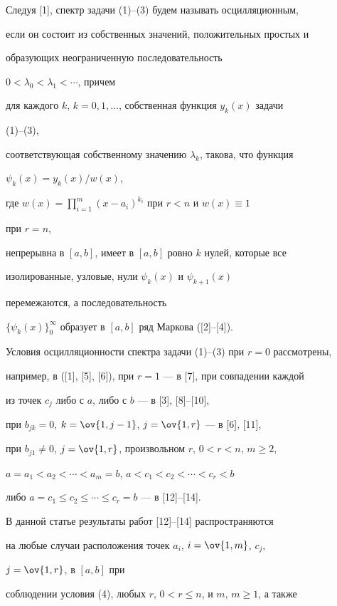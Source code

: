  


Следуя [1], спектр задачи (1)--(3) будем называть осцилляционным, 


если он состоит из собственных значений, положительных простых и 


образующих неограниченную последовательность 


$0<\lambda_0<\lambda_1<\dotsb$, причем 


для каждого $k$, $k=0,1,\dotsc$, собственная функция $y_k(x)$ задачи 


(1)--(3), 


соответствующая собственному значению $\lambda_k$, такова, что функция 


$\psi_k(x)=y_k(x)/w(x)$, 


где $w(x)=\prod\limits^m_{i=1}(x-a_i)^{k_i}$ при $r<n$ и $w(x)\equiv 1$ 


при $r=n$, 


непрерывна в $[a,b]$, имеет в $[a,b]$ ровно $k$ нулей, которые все 


изолированные, узловые, нули $\psi_k(x)$ и $\psi_{k+1}(x)$ 


перемежаются, а последовательность 


$\{\psi_k(x)\}^\infty_0$ образует в $[a,b]$ ряд Маркова ([2]--[4]). 


 


Условия осцилляционности спектра задачи (1)--(3) при $r=0$ рассмотрены, 


например, в ([1], [5], [6]), при $r=1$ --- в [7], при совпадении каждой 


из точек $c_j$ либо с $a$, либо с $b$ --- в [3], [8]--[10], 


при $b_{jk}=0$, $k=\ov{1,j-1}$, $j=\ov{1,r}$ --- в [6], [11], 


при $b_{j1}\ne 0$, $j=\ov{1,r}$, произвольном $r$, $0<r<n$, $m\ge2$, 


$a=a_1<a_2<\dotsb<a_m=b$, $a<c_1<c_2<\dotsb<c_r<b$ 


либо $a=c_1\le c_2\le\dotsb\le c_r=b$ --- в [12]--[14]. 


 


В данной статье результаты работ [12]--[14] распространяются 


на любые случаи расположения точек $a_i$, $i=\ov{1,m}$, $c_j$, 


$j=\ov{1,r}$, в $[a,b]$ при 


соблюдении условия (4), любых $r$, $0<r\le n$, и $m$, $m\ge 1$, а также 


